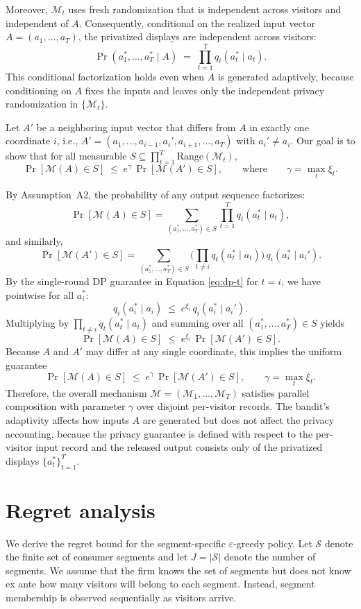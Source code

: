 \documentclass[mksc,nonblindrev]{informs3}
\begin{document}
\begin{APPENDICES}
\begin{enumerate}
Moreover, $\mathcal{M}_t$ uses fresh randomization that is independent across visitors and independent of $A$. Consequently, conditional on the realized input vector $A=(a_1,\dots,a_T)$, the privatized displays are independent across visitors:
\[
\Pr(a_1^*,\dots,a_T^* \mid A) \;=\; \prod_{t=1}^T q_t(a_t^*\mid a_t).
\]
This conditional factorization holds even when $A$ is generated adaptively, because conditioning on $A$ fixes the inputs and leaves only the independent privacy randomization in $\{\mathcal{M}_t\}$.
\end{enumerate}


Let $A'$ be a neighboring input vector that differs from $A$ in exactly one coordinate $i$, i.e.,
$A'=(a_1,\dots,a_{i-1},a_i',a_{i+1},\dots,a_T)$ with $a_i'\neq a_i$.
Our goal is to show that for all measurable
$S\subseteq \prod_{t=1}^T \mathrm{Range}(\mathcal{M}_t)$,
\[
\Pr[\mathcal{M}(A)\in S] \;\le\; e^{\gamma}\, \Pr[\mathcal{M}(A')\in S],
\qquad \text{where} \qquad \gamma=\max_t\xi_t.
\]

By Assumption~A2, the probability of any output sequence factorizes:
\[
\Pr[\mathcal{M}(A)\in S]
= \sum_{(a_1^*,\dots,a_T^*)\in S} \prod_{t=1}^T q_t(a_t^*\mid a_t),
\]
and similarly,
\[
\Pr[\mathcal{M}(A')\in S]
= \sum_{(a_1^*,\dots,a_T^*)\in S}
\Big(\prod_{t\neq i} q_t(a_t^*\mid a_t)\Big)\, q_i(a_i^*\mid a_i').
\]
By the single-round DP guarantee in Equation \eqref{eq:dp-t} for $t=i$, we have pointwise for all $a_i^*$:
\[
q_i(a_i^*\mid a_i) \;\le\; e^{\xi_i}\, q_i(a_i^*\mid a_i').
\]
Multiplying by $\prod_{t\neq i} q_t(a_t^*\mid a_t)$ and summing over all $(a_1^*,\dots,a_T^*)\in S$ yields
\[
\Pr[\mathcal{M}(A)\in S] \;\le\; e^{\xi_i}\, \Pr[\mathcal{M}(A')\in S].
\]
Because $A$ and $A'$ may differ at any single coordinate, this implies the uniform guarantee
\[
\Pr[\mathcal{M}(A)\in S] \;\le\; e^{\gamma}\, \Pr[\mathcal{M}(A')\in S],
\qquad \gamma=\max_t \xi_t.
\]
Therefore, the overall mechanism $\mathcal{M}=(\mathcal{M}_1,\dots,\mathcal{M}_T)$ satisfies parallel composition with parameter $\gamma$ over disjoint per-visitor records. The bandit’s adaptivity affects how inputs $A$ are generated but does not affect the privacy accounting, because the privacy guarantee is defined with respect to the per-visitor input record and the released output consists only of the privatized displays $\{a_t^*\}_{t=1}^T$.

\section{Regret analysis}
\label{web:regretanalysis_segment}
We derive the regret bound for the segment-specific $\varepsilon$-greedy policy. Let $\mathcal S$ denote the finite set of consumer segments and let $J=|\mathcal S|$ denote the number of segments. We assume that the firm knows the set of segments but does not know ex ante how many visitors will belong to each segment. Instead, segment membership is observed sequentially as visitors arrive.


\end{APPENDICES}
\end{document}
